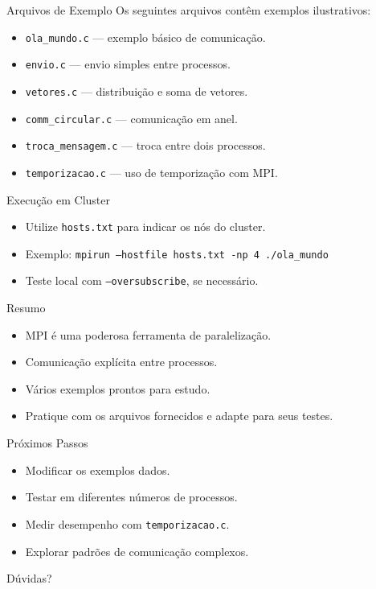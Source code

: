 \documentclass{beamer}
\begin{document}
\begin{frame}{Arquivos de Exemplo}
Os seguintes arquivos contêm exemplos ilustrativos:
\begin{itemize}
    \item \texttt{ola\_mundo.c} — exemplo básico de comunicação.
    \item \texttt{envio.c} — envio simples entre processos.
    \item \texttt{vetores.c} — distribuição e soma de vetores.
    \item \texttt{comm\_circular.c} — comunicação em anel.
    \item \texttt{troca\_mensagem.c} — troca entre dois processos.
    \item \texttt{temporizacao.c} — uso de temporização com MPI.
\end{itemize}
\end{frame}

\begin{frame}{Execução em Cluster}
\begin{itemize}
    \item Utilize \texttt{hosts.txt} para indicar os nós do cluster.
    \item Exemplo: \texttt{mpirun --hostfile hosts.txt -np 4 ./ola\_mundo}
    \item Teste local com \texttt{--oversubscribe}, se necessário.
\end{itemize}
\end{frame}

\begin{frame}{Resumo}
\begin{itemize}
    \item MPI é uma poderosa ferramenta de paralelização.
    \item Comunicação explícita entre processos.
    \item Vários exemplos prontos para estudo.
    \item Pratique com os arquivos fornecidos e adapte para seus testes.
\end{itemize}
\end{frame}

\begin{frame}{Próximos Passos}
\begin{itemize}
    \item Modificar os exemplos dados.
    \item Testar em diferentes números de processos.
    \item Medir desempenho com \texttt{temporizacao.c}.
    \item Explorar padrões de comunicação complexos.
\end{itemize}
\end{frame}

\begin{frame}
    \centering
    \Huge Dúvidas?
\end{frame}
\end{document}
